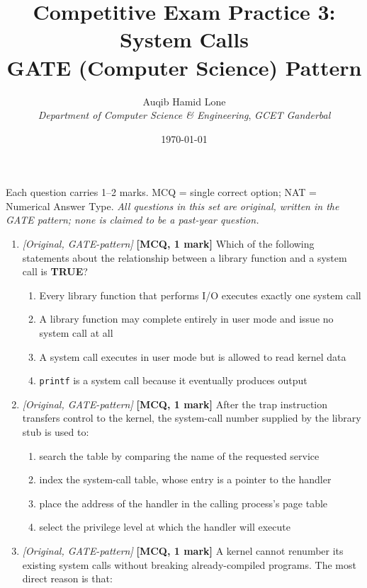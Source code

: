 \documentclass[11pt]{article}
\title{Competitive Exam Practice 3: System Calls\\\large GATE (Computer Science) Pattern}
\author{Auqib Hamid Lone\\[0.3em]
  \emph{Department of Computer Science \& Engineering}, \emph{GCET Ganderbal}}
\date{\today}
\begin{document}
\maketitle

\noindent Each question carries 1--2 marks. MCQ = single correct option; NAT = Numerical Answer Type. \emph{All questions in this set are original, written in the GATE pattern; none is claimed to be a past-year question.}

\begin{enumerate}
\item[\textbf{Q1}] \textit{[Original, GATE-pattern]} \textbf{[MCQ, 1 mark]} Which of the following statements about the relationship between a library function and a system call is \textbf{TRUE}?

\begin{enumerate}
  \item[(A)] Every library function that performs I/O executes exactly one system call
  \item[(B)] A library function may complete entirely in user mode and issue no system call at all
  \item[(C)] A system call executes in user mode but is allowed to read kernel data
  \item[(D)] \texttt{printf} is a system call because it eventually produces output
\end{enumerate}

\item[\textbf{Q2}] \textit{[Original, GATE-pattern]} \textbf{[MCQ, 1 mark]} After the trap instruction transfers control to the kernel, the system-call number supplied by the library stub is used to:

\begin{enumerate}
  \item[(A)] search the table by comparing the name of the requested service
  \item[(B)] index the system-call table, whose entry is a pointer to the handler
  \item[(C)] place the address of the handler in the calling process's page table
  \item[(D)] select the privilege level at which the handler will execute
\end{enumerate}

\item[\textbf{Q3}] \textit{[Original, GATE-pattern]} \textbf{[MCQ, 1 mark]} A kernel cannot renumber its existing system calls without breaking already-compiled programs. The most direct reason is that:


\end{enumerate}
\end{document}
